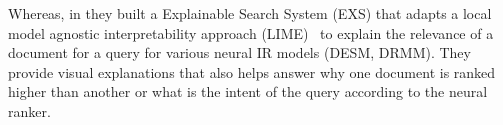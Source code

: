 Whereas, in \cite{Singh19} they built a \textsf{Explainable Search System} (EXS) that adapts a local model agnostic interpretability approach (LIME)~\citep{Ribeiro16} to explain the relevance of a document for a query for various neural IR models (DESM, DRMM). They provide visual explanations that also helps answer why one document is ranked higher than another or what is the intent of the query according to the neural ranker. 
